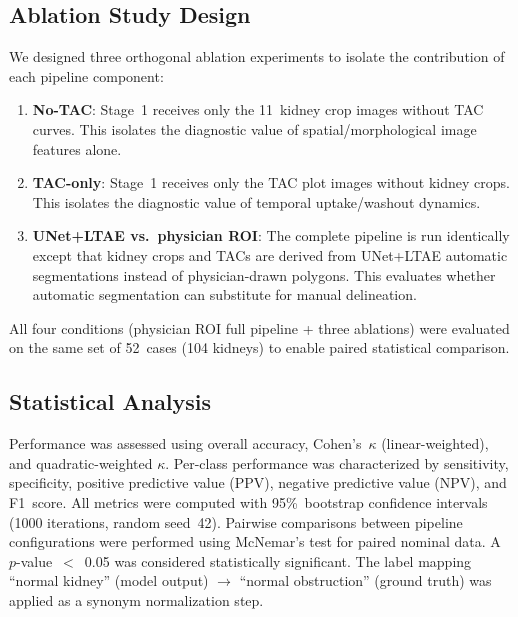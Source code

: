 \documentclass[sn-basic]{sn-jnl}
\begin{document}
\subsection{Ablation Study Design}

We designed three orthogonal ablation experiments to isolate
the contribution of each pipeline component:

\begin{enumerate}
  \item[\textbf{A1}] \textbf{No-TAC}: Stage~1 receives only
    the 11~kidney crop images without TAC curves.  This
    isolates the diagnostic value of spatial/morphological
    image features alone.
  \item[\textbf{A2}] \textbf{TAC-only}: Stage~1 receives only
    the TAC plot images without kidney crops.  This isolates
    the diagnostic value of temporal uptake/washout dynamics.
  \item[\textbf{A3}] \textbf{UNet+LTAE vs.\ physician ROI}:
    The complete pipeline is run identically except that
    kidney crops and TACs are derived from UNet+LTAE
    automatic segmentations instead of physician-drawn
    polygons.  This evaluates whether automatic segmentation
    can substitute for manual delineation.
\end{enumerate}

All four conditions (physician ROI full pipeline + three
ablations) were evaluated on the same set of 52~cases (104
kidneys) to enable paired statistical comparison.

\subsection{Statistical Analysis}

Performance was assessed using overall accuracy,
Cohen's~$\kappa$ (linear-weighted), and quadratic-weighted
$\kappa$.  Per-class performance was characterized by
sensitivity, specificity, positive predictive value (PPV),
negative predictive value (NPV), and F1~score.  All metrics
were computed with 95\%~bootstrap confidence intervals (1000
iterations, random seed~42).  Pairwise comparisons between
pipeline configurations were performed using McNemar's test
for paired nominal data.  A~$p$-value~$<$~0.05 was
considered statistically significant.  The label mapping
``normal kidney'' (model output) $\rightarrow$ ``normal
obstruction'' (ground truth) was applied as a synonym
normalization step.

\end{document}
